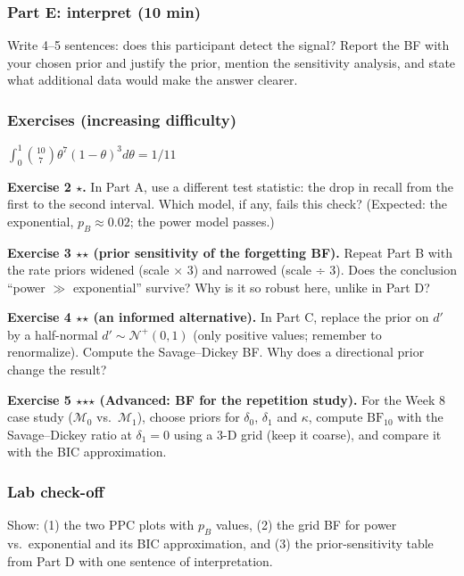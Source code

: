\subsubsection{Part E: interpret (10 min)}

Write 4--5 sentences: does this participant detect the signal? Report
the BF with your chosen prior and justify the prior, mention the
sensitivity analysis, and state what additional data would make the
answer clearer.

\subsubsection{Exercises (increasing difficulty)}

\(\int_0^1 \binom{10}{7}\theta^7(1-\theta)^3 d\theta = 1/11\)

\textbf{Exercise 2 \ensuremath{\star}.} In Part A, use a different test statistic: the
drop in recall from the first to the second interval. Which model, if
any, fails this check? (Expected: the exponential, \(p_B \approx 0.02\);
the power model passes.)

\textbf{Exercise 3 \ensuremath{\star}\ensuremath{\star} (prior sensitivity of the forgetting BF).} Repeat
Part B with the rate priors widened (scale × 3) and narrowed (scale ÷
3). Does the conclusion ``power \ensuremath{\gg} exponential'' survive? Why is it so
robust here, unlike in Part D?

\textbf{Exercise 4 \ensuremath{\star}\ensuremath{\star} (an informed alternative).} In Part C, replace the
prior on \(d'\) by a half-normal \(d' \sim \mathcal{N}^+(0, 1)\) (only
positive values; remember to renormalize). Compute the Savage--Dickey
BF. Why does a directional prior change the result?

\textbf{Exercise 5 \ensuremath{\star}\ensuremath{\star}\ensuremath{\star} (Advanced: BF for the repetition study).} For the
Week 8 case study (\(\mathcal{M}_0\) vs.~\(\mathcal{M}_1\)), choose
priors for \(\delta_0\), \(\delta_1\) and \(\kappa\), compute
\(\mathrm{BF}_{10}\) with the Savage--Dickey ratio at \(\delta_1 = 0\)
using a 3-D grid (keep it coarse), and compare it with the BIC
approximation.

\subsubsection{Lab check-off}

Show: (1) the two PPC plots with \(p_B\) values, (2) the grid BF for
power vs.~exponential and its BIC approximation, and (3) the
prior-sensitivity table from Part D with one sentence of interpretation.

